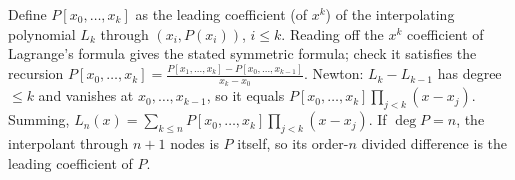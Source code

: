 \documentclass[11pt,a4paper]{article}
\begin{document}
 Define $P[x_0,\dots,x_k]$ as the leading coefficient (of $x^k$) of the interpolating polynomial $L_k$ through $(x_i,P(x_i))$, $i\le k$. Reading off the $x^k$ coefficient of Lagrange's formula gives the stated symmetric formula; check it satisfies the recursion $P[x_0,\dots,x_k]=\frac{P[x_1,\dots,x_k]-P[x_0,\dots,x_{k-1}]}{x_k-x_0}$.
 Newton: $L_k-L_{k-1}$ has degree $\le k$ and vanishes at $x_0,\dots,x_{k-1}$, so it equals $P[x_0,\dots,x_k]\prod_{j<k}(x-x_j)$. Summing, $L_n(x)=\sum_{k\le n}P[x_0,\dots,x_k]\prod_{j<k}(x-x_j)$.
 If $\deg P=n$, the interpolant through $n+1$ nodes is $P$ itself, so its order-$n$ divided difference is the leading coefficient of $P$.
\end{document}
